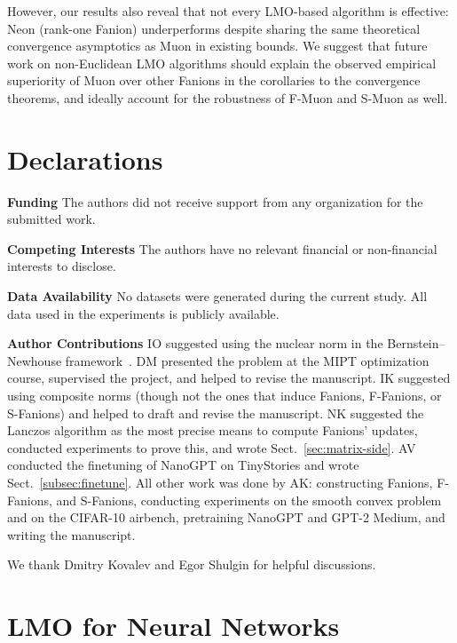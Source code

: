 \documentclass[smallextended,referee,envcountsect]{svjour3}
\newcommand{\sectionref}[1]{Sect.~\ref{#1}}
\begin{document}
 However, our results also reveal that not every LMO-based algorithm is effective: Neon (rank-one Fanion) underperforms despite sharing the same theoretical convergence asymptotics as Muon in existing bounds. We suggest that future work on non-Euclidean LMO algorithms should explain the observed empirical superiority of Muon over other Fanions in the corollaries to the convergence theorems, and ideally account for the robustness of F-Muon and S-Muon as well.

\section*{Declarations}

\noindent\textbf{Funding} The authors did not receive support from any organization for the submitted work.

\noindent\textbf{Competing Interests} The authors have no relevant financial or non-financial interests to disclose.

\noindent\textbf{Data Availability} No datasets were generated during the current study. All data used in the experiments is publicly available.

\noindent\textbf{Author Contributions} IO suggested using the nuclear norm in the Bernstein--Newhouse framework~\cite{bernstein2024oldoptimizernewnorm}. DM presented the problem at the MIPT optimization course, supervised the project, and helped to revise the manuscript. IK suggested using composite norms (though not the ones that induce Fanions, F-Fanions, or S-Fanions) and helped to draft and revise the manuscript. NK suggested the Lanczos algorithm as the most precise means to compute Fanions' updates, conducted experiments to prove this, and wrote \sectionref{sec:matrix-side}. AV conducted the finetuning of NanoGPT on TinyStories and wrote \sectionref{subsec:finetune}. All other work was done by AK: constructing Fanions, F-Fanions, and S-Fanions, conducting experiments on the smooth convex problem and on the CIFAR-10 airbench, pretraining NanoGPT and GPT-2 Medium, and writing the manuscript.

\begin{acknowledgements}
We thank Dmitry Kovalev and Egor Shulgin for helpful discussions.
\end{acknowledgements}



 
 \appendix
 \section{LMO for Neural Networks}\label{sec:lmo_for_nn}
 
\end{document}
